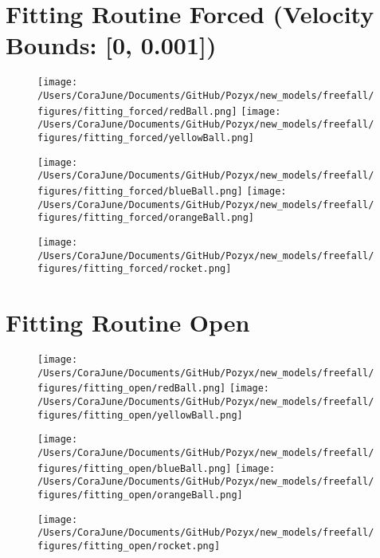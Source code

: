 \documentclass{article}
\begin{document}
\section{Fitting Routine Forced (Velocity Bounds: [0, 0.001])}
\begin{figure}[h!]
\begin{multicols}{2}
    \texttt{[image: /Users/CoraJune/Documents/GitHub/Pozyx/new\_models/freefall/figures/fitting\_forced/redBall.png]}
    \texttt{[image: /Users/CoraJune/Documents/GitHub/Pozyx/new\_models/freefall/figures/fitting\_forced/yellowBall.png]}
\end{multicols}

\begin{multicols}{2}
    \texttt{[image: /Users/CoraJune/Documents/GitHub/Pozyx/new\_models/freefall/figures/fitting\_forced/blueBall.png]}
    \texttt{[image: /Users/CoraJune/Documents/GitHub/Pozyx/new\_models/freefall/figures/fitting\_forced/orangeBall.png]}
\end{multicols}

\texttt{[image: /Users/CoraJune/Documents/GitHub/Pozyx/new\_models/freefall/figures/fitting\_forced/rocket.png]}

\end{figure}
\newpage
\section{Fitting Routine Open}
\begin{figure}[h!]
\begin{multicols}{2}
    \texttt{[image: /Users/CoraJune/Documents/GitHub/Pozyx/new\_models/freefall/figures/fitting\_open/redBall.png]}
    \texttt{[image: /Users/CoraJune/Documents/GitHub/Pozyx/new\_models/freefall/figures/fitting\_open/yellowBall.png]}
\end{multicols}

\begin{multicols}{2}
    \texttt{[image: /Users/CoraJune/Documents/GitHub/Pozyx/new\_models/freefall/figures/fitting\_open/blueBall.png]}
    \texttt{[image: /Users/CoraJune/Documents/GitHub/Pozyx/new\_models/freefall/figures/fitting\_open/orangeBall.png]}
\end{multicols}

\texttt{[image: /Users/CoraJune/Documents/GitHub/Pozyx/new\_models/freefall/figures/fitting\_open/rocket.png]}

\end{figure}
\end{document}
